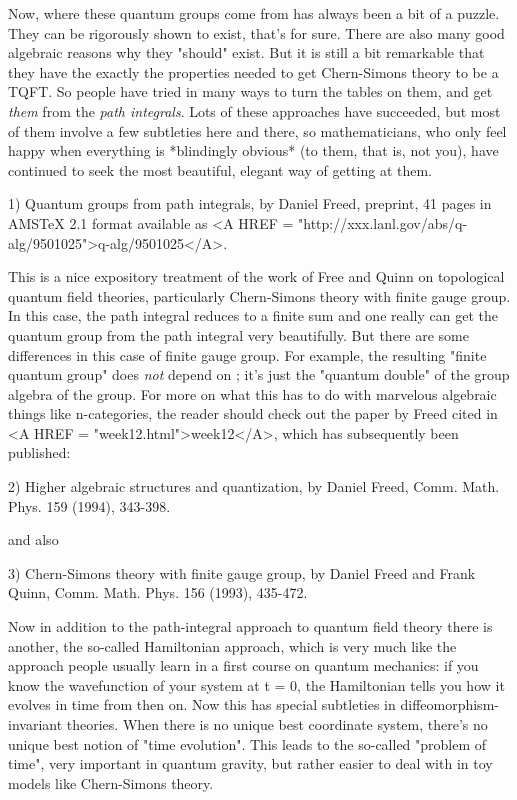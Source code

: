 Now, where these quantum groups come from has always been a bit of a
puzzle.  They can be rigorously shown to exist, that's for sure.
There are also many good algebraic reasons why they "should" exist.
But it is still a bit remarkable that they have the exactly the
properties needed to get Chern-Simons theory to be a TQFT.  So people
have tried in many ways to turn the tables on them, and get \emph{them}
from the \emph{path integrals}.  Lots of these approaches have succeeded,
but most of them involve a few subtleties here and there, so
mathematicians, who only feel happy when everything is *blindingly
obvious* (to them, that is, not you), have continued to seek the most
beautiful, elegant way of getting at them.

1) Quantum groups from path integrals, by Daniel Freed, preprint,
41 pages in AMSTeX 2.1 format available as <A HREF = "http://xxx.lanl.gov/abs/q-alg/9501025">q-alg/9501025</A>.

This is a nice expository treatment of the work of Free and Quinn 
on topological quantum field theories, particularly Chern-Simons theory
with finite gauge group.  In this case, the path integral reduces to 
a finite sum and one really can get the quantum group from the path 
integral very beautifully.  But there are some differences in this
case of finite gauge group.  For example, the resulting "finite quantum 
group" does \emph{not} depend on \hbar ; it's just the "quantum double" of the
group algebra of the group.  For more on what this has to do with marvelous
algebraic things like n-categories, the reader should check out the paper 
by Freed cited in <A HREF = "week12.html">week12</A>, which has subsequently been published:

2) Higher algebraic structures and quantization, by Daniel Freed,
Comm. Math. Phys. 159 (1994), 343-398.

and also

3) Chern-Simons theory with finite gauge group, by Daniel Freed and
Frank Quinn, Comm. Math. Phys. 156 (1993), 435-472.


Now in addition to the path-integral approach to quantum field theory there 
is another, the so-called Hamiltonian approach, which is very much like
the approach people usually learn in a first course on quantum mechanics:
if you know the wavefunction of your system at t = 0, the Hamiltonian tells
you how it evolves in time from then on.  Now this has special subtleties
in diffeomorphism-invariant theories.  When there is no unique best 
coordinate system, there's no unique best notion of "time evolution".
This leads to the so-called "problem of time", very important in 
quantum gravity, but rather easier to deal with in toy models like
Chern-Simons theory.  

